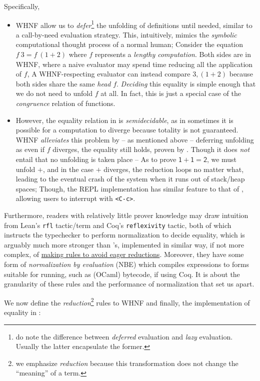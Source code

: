 \documentclass[a4paper, 11pt]{article}
\theoremstyle{remark}\newtheorem*{remark}{Remark}
\theoremstyle{definition}\newtheorem*{definition}{Definition}
\begin{document}
Specifically,
\begin{itemize}
\item WHNF allow us to \emph{defer}\footnote{
do note the difference between \emph{deferred} evaluation and \emph{lazy} evaluation.
Usually the latter encapsulate the former.
} the unfolding of definitions until needed, similar to a
call-by-need evaluation strategy. This, intuitively, mimics the
\emph{symbolic} computational thought process of a normal human; Consider the equation
$f\ 3 = f\ (1 + 2)$ where $f$ represents a \emph{lengthy computation}.
Both sides are in WHNF, where a naive evaluator may spend time reducing all the application of $f$,
A WHNF-respecting evaluator can instead compare $3, (1+2)$ because both sides share the same
\emph{head} $f$. \emph{Deciding} this equality is
simple enough that we do not need to unfold $f$ at all. In fact, this is just a
special case of the \emph{congruence} relation of functions.

\item However, the equality relation in \Tigrisd is \emph{semidecidable}, as in sometimes it is
possible for a computation to diverge because totality is not guaranteed. WHNF
\emph{alleviates} this problem by -- as mentioned above -- deferring unfolding as
even if $f$ diverges, the equality still holds, proven by \Tigrisd.
Though it does \emph{not} entail that no unfolding is taken place -- As to prove
$\mathsf{1 + 1 = 2}$, we must unfold $+$, and in the case $+$ diverges, the
reduction loops no matter what, leading to the eventual crash of the system
when it runs out of stack/heap spaces; Though, the REPL implementation has
similar feature to that of \Tigris, allowing users to interrupt with \texttt{<C-c>}.
\end{itemize}

Furthermore, readers with relatively little prover knowledge may draw intuition from
Lean's \texttt{rfl} tactic/term and Coq's \texttt{reflexivity} tactic, both of
which instructs the typechecker to perform normalization to decide equality, which
is arguably much more stronger than \Tigrisd's, implemented in similar way,
if not more complex, of
\underline{making rules to avoid eager reductions}. Moreover, they have some form of \emph{normalization by evaluation} (NBE) which compiles expressions
to forms suitable for running, such as (OCaml) bytecode, if using Coq.
It is about
the granularity of these rules and the performance of normalization that set us apart.

We now define the \emph{reduction}\footnote{
we emphasize \emph{reduction} because this transformation does not change
the ``meaning'' of a term.
}
rules to WHNF and finally,
the implementation of equality in \Tigrisd :
\end{document}
